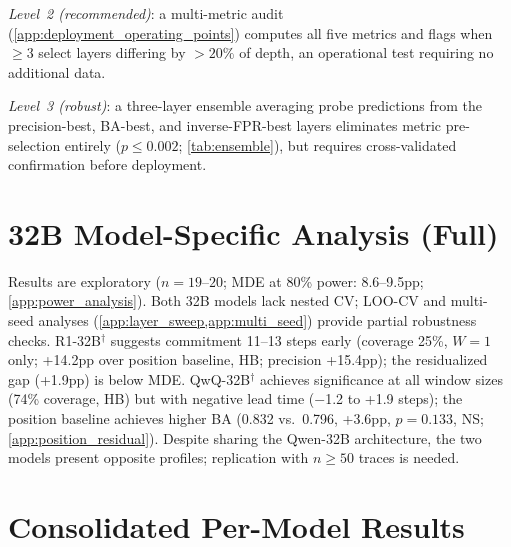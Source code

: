 \emph{Level~2 (recommended)}: a multi-metric audit (\cref{app:deployment_operating_points}) computes all five metrics and flags when ${\geq}3$ select layers differing by ${>}20\%$ of depth, an operational test requiring no additional data.

\emph{Level~3 (robust)}: a three-layer ensemble averaging probe predictions from the precision-best, BA-best, and inverse-FPR-best layers eliminates metric pre-selection entirely ($p \leq 0.002$; \cref{tab:ensemble}), but requires cross-validated confirmation before deployment.

\section{32B Model-Specific Analysis (Full)}
\label{app:32b_full}

Results are exploratory ($n{=}19$--$20$; MDE at 80\% power: 8.6--9.5pp; \cref{app:power_analysis}). Both 32B models lack nested CV; LOO-CV and multi-seed analyses (\cref{app:layer_sweep,app:multi_seed}) provide partial robustness checks. R1-32B$^\dagger$ suggests commitment 11--13 steps early (coverage 25\%, $W{=}1$ only; +14.2pp over position baseline, HB; precision +15.4pp); the residualized gap (+1.9pp) is below MDE. QwQ-32B$^\dagger$ achieves significance at all window sizes (74\% coverage, HB) but with negative lead time ($-$1.2 to +1.9 steps); the position baseline achieves higher BA (0.832 vs.\ 0.796, +3.6pp, $p{=}0.133$, NS; \cref{app:position_residual}). Despite sharing the Qwen-32B architecture, the two models present opposite profiles; replication with $n{\geq}50$ traces is needed.

\section*{Consolidated Per-Model Results}
\label{app:consolidated}

